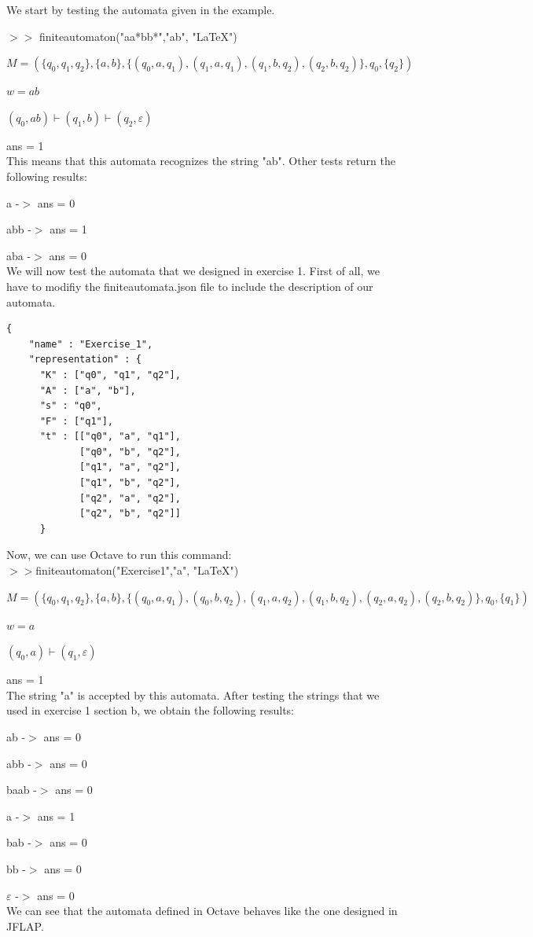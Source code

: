 \documentclass[fleqn, 10pt]{article}
\theoremstyle{plain}
\theoremstyle{definition}
\begin{document}
We start by testing the automata given in the example.

$>>$ finiteautomaton("aa*bb*","ab", "LaTeX")

$M = (\{q_0, q_1, q_2\}, \{a, b\}, \{(q_0, a, q_1), (q_1, a, q_1), (q_1, b, q_2), (q_2, b, q_2)\}, q_0, \{q_2\})$

$w = ab$

$(q_0, ab) \vdash (q_1, b) \vdash (q_2, \varepsilon)$

ans = 1
\\

This means that this automata recognizes the string "ab". Other tests return the following results:

a -$>$ ans = 0

abb -$>$ ans = 1

aba -$>$ ans = 0
\\

We will now test the automata that we designed in exercise 1.
First of all, we have to modifiy the finiteautomata.json file to include the description of our automata.

\begin{verbatim}
{
    "name" : "Exercise_1",
    "representation" : {
      "K" : ["q0", "q1", "q2"],
      "A" : ["a", "b"],
      "s" : "q0",
      "F" : ["q1"],
      "t" : [["q0", "a", "q1"],
             ["q0", "b", "q2"],
             ["q1", "a", "q2"],
             ["q1", "b", "q2"],
             ["q2", "a", "q2"],
             ["q2", "b", "q2"]]
      }
\end{verbatim}
\newpage
Now, we can use Octave to run this command:\\

$>>$finiteautomaton("Exercise1","a", "LaTeX")

$M = (\{q_0, q_1, q_2\}, \{a, b\}, \{(q_0, a, q_1), (q_0, b, q_2), (q_1, a, q_2), (q_1, b, q_2), (q_2, a, q_2), (q_2, b, q_2)\}, q_0, \{q_1\})$

$w = a$

$(q_0, a) \vdash (q_1, \varepsilon)$

ans = 1
\\

The string "a" is accepted by this automata. After testing the strings that we used in exercise 1 section b, we obtain the following results:

ab -$>$ ans = 0

abb -$>$ ans = 0

baab -$>$ ans = 0

a -$>$ ans = 1

bab -$>$ ans = 0

bb -$>$ ans = 0

$\varepsilon$ -$>$ ans = 0
\\

We can see that the automata defined in Octave behaves like the one designed in JFLAP.
\end{document}
